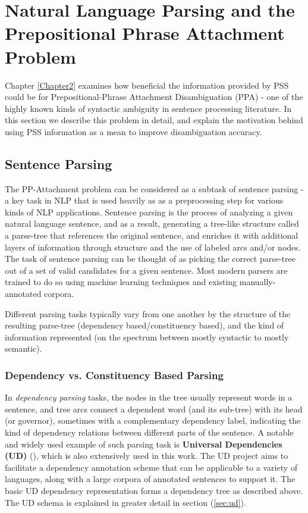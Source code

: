 \section{Natural Language Parsing and the Prepositional Phrase Attachment Problem} \label{sec:ppatt}

Chapter \ref{Chapter2} examines how beneficial the information provided by PSS could be for Prepositional-Phrase Attachment Disambiguation (PPA)  - one of the highly known kinds of syntactic ambiguity in sentence processing literature. In this section we describe this problem in detail, and explain the motivation behind using PSS information as a mean to improve disambiguation accuracy. 

\subsection{Sentence Parsing}

The PP-Attachment problem can be considered as a subtask of sentence parsing - a key task in NLP that is used heavily as as a preprocessing step for various kinds of NLP applications.  Sentence parsing is the process of analyzing a given natural language sentence, and as a result, generating a tree-like structure called a parse-tree that references the original sentence, and enriches it with additional layers of information through structure and the use of labeled arcs and/or nodes. The task of sentence parsing can be thought of as picking the correct parse-tree out of a set of valid candidates for a given sentence. Most modern parsers are trained to do so using machine learning techniques and existing manually-annotated corpora.

 Different parsing tasks typically vary from one another by the structure of the resulting parse-tree (dependency based/constituency based), and the kind of information represented (on the spectrum between mostly syntactic to mostly semantic).

\subsubsection{Dependency vs. Constituency Based Parsing}

In \emph{dependency parsing} tasks, the nodes in the tree usually represent words in a sentence, and tree arcs connect a dependent word (and its sub-tree) with its head (or governor), sometimes with a complementary dependency label, indicating the kind of dependency relations between different parts of the sentence. A notable and widely used example of such parsing task is \textbf{Universal Dependencies (UD)} (\cite{nivre-16}), which is also extensively used in this work. The UD project aims to facilitate a dependency annotation scheme that can be applicable to a variety of languages, along with a large corpora of annotated sentences to support it. The basic UD dependency representation forms a dependency tree as described above. The UD schema is explained in greater detail in section (\ref{sec:ud}).


